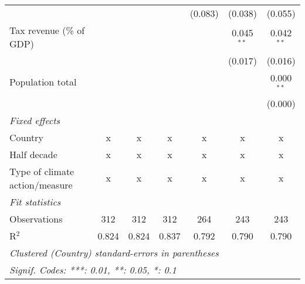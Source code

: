 \begin{tabular}{lcccccc}
                                                    &         &         &                & (0.083)        & (0.038)        & (0.055)\\   
   Tax revenue (\% of GDP)                          &         &         &                &                & 0.045$^{**}$   & 0.042$^{**}$\\   
                                                    &         &         &                &                & (0.017)        & (0.016)\\   
   Population total                                 &         &         &                &                &                & 0.000$^{**}$\\   
                                                    &         &         &                &                &                & (0.000)\\   
   \emph{Fixed effects}\\
   Country                                          & x       & x       & x              & x              & x              & x\\  
   Half decade                                      & x       & x       & x              & x              & x              & x\\  
   Type of climate action/measure                   & x       & x       & x              & x              & x              & x\\  
   \midrule \emph{Fit statistics}\\
   Observations                                     & 312     & 312     & 312            & 264            & 243            & 243\\  
   R$^2$                                            & 0.824   & 0.824   & 0.837          & 0.792          & 0.790          & 0.790\\  
   \midrule
   \multicolumn{7}{l}{\emph{Clustered (Country) standard-errors in parentheses}}\\
   \multicolumn{7}{l}{\emph{Signif. Codes: ***: 0.01, **: 0.05, *: 0.1}}\\
\end{tabular}
\par\endgroup


